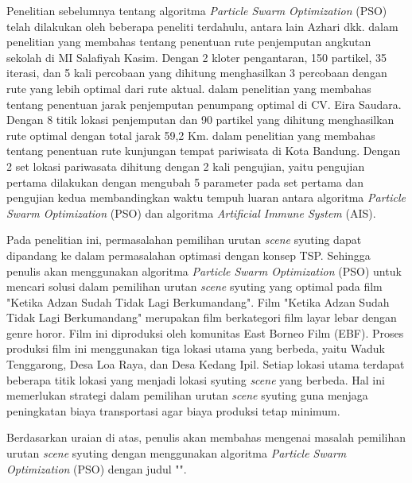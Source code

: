 {    %
    Penelitian sebelumnya tentang algoritma \textit{Particle Swarm Optimization} (PSO) telah dilakukan oleh beberapa peneliti terdahulu, antara lain Azhari dkk. \textcite{Azhari:2018} dalam penelitian yang membahas tentang penentuan rute penjemputan angkutan sekolah di MI Salafiyah Kasim.
    Dengan 2 kloter pengantaran, 150 partikel, 35 iterasi, dan 5 kali percobaan yang dihitung menghasilkan 3 percobaan dengan rute yang lebih optimal dari rute aktual.
    \textcite{Natalia:2019} dalam penelitian yang membahas tentang penentuan jarak penjemputan penumpang optimal di CV. Eira Saudara.
    Dengan 8 titik lokasi penjemputan dan 90 partikel yang dihitung menghasilkan rute optimal dengan total jarak 59,2 Km.
    \textcite{Dalyono:2017} dalam penelitian yang membahas tentang penentuan rute kunjungan tempat pariwisata di Kota Bandung.
    Dengan 2 set lokasi pariwasata dihitung dengan 2 kali pengujian, yaitu pengujian pertama dilakukan dengan mengubah 5 parameter pada set pertama dan pengujian kedua membandingkan waktu tempuh luaran antara algoritma \textit{Particle Swarm Optimization} (PSO) dan algoritma \textit{Artificial Immune System} (AIS).

    Pada penelitian ini, permasalahan pemilihan urutan \textit{scene} syuting dapat dipandang ke dalam permasalahan optimasi dengan konsep TSP.
    Sehingga penulis akan menggunakan algoritma \textit{Particle Swarm Optimization} (PSO) untuk mencari solusi dalam pemilihan urutan \textit{scene} syuting yang optimal pada film "Ketika Adzan Sudah Tidak Lagi Berkumandang".
    Film "Ketika Adzan Sudah Tidak Lagi Berkumandang" merupakan film berkategori film layar lebar dengan genre horor.
    Film ini diproduksi oleh komunitas East Borneo Film (EBF).
    Proses produksi film ini menggunakan tiga lokasi utama yang berbeda, yaitu Waduk Tenggarong, Desa Loa Raya, dan Desa Kedang Ipil.
    Setiap lokasi utama terdapat beberapa titik lokasi yang menjadi lokasi syuting \textit{scene} yang berbeda.
    Hal ini memerlukan strategi dalam pemilihan urutan \textit{scene} syuting guna menjaga peningkatan biaya transportasi agar biaya produksi tetap minimum.

    Berdasarkan uraian di atas, penulis akan membahas mengenai masalah pemilihan urutan \textit{scene} syuting dengan menggunakan algoritma \textit{Particle Swarm Optimization} (PSO) dengan judul
    "\judul".
}
\vspace{-4mm}

